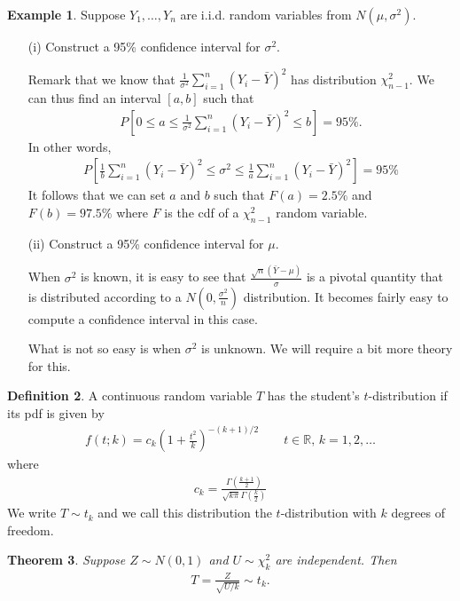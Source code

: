 \documentclass[11pt]{amsart}
\newtheorem{theorem}{Theorem}[section]
\theoremstyle{definition}
\newtheorem{definition}[theorem]{Definition}
\newtheorem{example}[theorem]{Example}
\numberwithin{equation}{section}
\begin{document}
\begin{example}
    Suppose $Y_1,\ldots,Y_n$ are i.i.d. random variables from $N(\mu,\sigma^2)$.
    \begin{enumerate}
        \item [(i)] Construct a 95\% confidence interval for $\sigma^2$.

        Remark that we know that $\frac{1}{\sigma^2}\sum_{i=1}^n(Y_i-\bar Y)^2$ has distribution $\chi^2_{n-1}$. We can thus find an interval $[a,b]$ such that
        \begin{align*}
            P[0\le a\le\frac{1}{\sigma^2}\sum_{i=1}^n(Y_i-\bar Y)^2\le b]=95\%.
        \end{align*}
        In other words,
        \begin{align*}
            P[\frac{1}{b}\sum_{i=1}^n(Y_i-\bar Y)^2\le \sigma^2\le \frac{1}{a}\sum_{i=1}^n(Y_i-\bar Y)^2]=95\%
        \end{align*}
        It follows that we can set $a$ and $b$ such that $F(a)=2.5\%$ and $F(b)=97.5\%$ where $F$ is the cdf of a $\chi_{n-1}^2$ random variable.
        \item [(ii)] Construct a 95\% confidence interval for $\mu$.
    
        When $\sigma^2$ is known, it is easy to see that $\frac{\sqrt{n}(\bar Y-\mu)}{\sigma}$ is a pivotal quantity that is distributed according to a $N(0,\frac{\sigma^2}{n})$ distribution. It becomes fairly easy to compute a confidence interval in this case.
    
        What is not so easy is when $\sigma^2$ is unknown. We will require a bit more theory for this.
    \end{enumerate}
\end{example}
\setcounter{theorem}{43}
\begin{definition}
    A continuous random variable $T$ has the student's $t$-distribution if its pdf is given by
    \begin{align*}
        f(t;k)=c_k\left(1+\frac{t^2}{k}\right)^{-(k+1)/2}\qquad t\in\mathbb R,\,k=1,2,\ldots
    \end{align*}
    where
    \begin{align*}
        c_k=\frac{\Gamma(\frac{k+1}{2})}{\sqrt{k\pi}\Gamma(\frac{k}{2})}
    \end{align*}
    We write $T\sim t_k$ and we call this distribution the $t$-distribution with $k$ degrees of freedom.
\end{definition}
\begin{theorem}\label{t-dist-prop}
    Suppose $Z\sim N(0,1)$ and $U\sim\chi_{k}^2$ are independent. Then 
    \begin{align*}
        T=\frac{Z}{\sqrt{U/k}}\sim t_k.
    \end{align*}
\end{theorem}
\end{document}
